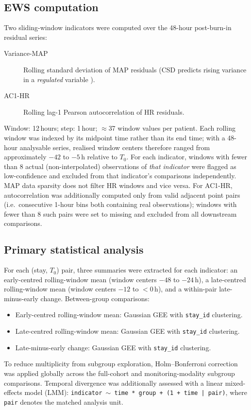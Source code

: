\documentclass[referee,lineno,pdflatex]{sn-article-template/sn-jnl}
\begin{document}
\subsection{EWS computation}
\label{sec:ews}

Two sliding-window indicators were computed over the 48-hour post-burn-in residual series:
\begin{description}
  \item[Variance-MAP] Rolling standard deviation of MAP residuals
    (CSD predicts rising variance in a \emph{regulated} variable \cite{rector2021}).
  \item[AC1-HR] Rolling lag-1 Pearson autocorrelation of HR residuals.
\end{description}
Window: 12\,hours; step: 1\,hour; $\approx$37 window values per patient.
Each rolling window was indexed by its midpoint time rather than its end time;
with a 48-hour analysable series, realised window centers therefore ranged from
approximately $-42$ to $-5$\,h relative to $T_0$.
For each indicator, windows with fewer than 8 actual (non-interpolated) observations
of \emph{that indicator} were flagged as low-confidence and excluded from that
indicator's comparisons independently.
MAP data sparsity does not filter HR windows and vice versa.
For AC1-HR, autocorrelation was additionally computed only from valid adjacent point
pairs (i.e.\ consecutive 1-hour bins both containing real observations);
windows with fewer than 8 such pairs were set to missing and excluded from all
downstream comparisons.

\subsection{Primary statistical analysis}
\label{sec:stats}

For each (stay, $T_0$) pair, three summaries were extracted for each indicator:
an early-centred rolling-window mean (window centers $-48$ to $-24$\,h),
a late-centred rolling-window mean (window centers $-12$ to $<0$\,h),
and a within-pair late-minus-early change.
Between-group comparisons:
\begin{itemize}
  \item Early-centred rolling-window mean: Gaussian GEE with \texttt{stay\_id} clustering.
  \item Late-centred rolling-window mean: Gaussian GEE with \texttt{stay\_id} clustering.
  \item Late-minus-early change: Gaussian GEE with \texttt{stay\_id} clustering.
\end{itemize}
To reduce multiplicity from subgroup exploration, Holm--Bonferroni correction was
applied globally across the full-cohort and monitoring-modality subgroup comparisons.
Temporal divergence was additionally assessed with a linear mixed-effects model (LMM):
\texttt{indicator $\sim$ time * group + (1 + time | pair)}, where \texttt{pair}
denotes the matched analysis unit.
\end{document}
